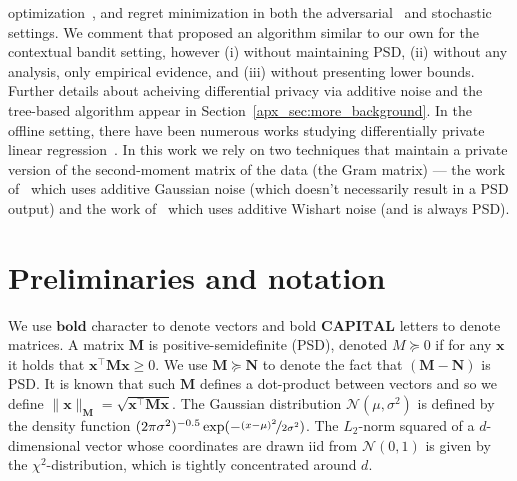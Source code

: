 \documentclass{article}
\renewcommand{\vec}[1]{\bm{#1}}
\providecommand\transp{\top}
\let\transpsymbol\transp
\renewcommand{\transp}[1]{#1^\transpsymbol}
\newcommand{\Normal}{\mathcal{N}}
\begin{document}
optimization~\cite{JainDPOnlineLearning2012}, and regret minimization
in both the
adversarial~\citep{SmithThakurtaPrivateOnlineLearning2013,TossouAchievingPrivacyAdversarial2017}
and
stochastic~\cite{MishraNearlyOptimalDPBandits2015,TossouAlgDPBandits2016}
settings. We comment that \citet{MishraNearlyOptimalDPBandits2015}
proposed an algorithm similar to our own for the contextual bandit
setting, however (i) without maintaining PSD, (ii) without any
analysis, only empirical evidence, and (iii) without presenting lower
bounds. Further details about acheiving differential privacy via additive noise and the tree-based algorithm appear in Section~\ref{apx_sec:more_background}.
%
In the offline setting, there have been numerous works studying differentially private linear regression~\citep{ChaudhuriDPERM2011,BassilyPrivateEmpiricalRisk2014}. In this work we rely on two techniques that maintain a private version of the second-moment matrix of the data (the Gram matrix) --- the work of~\cite{DworkAnalyzeGauss2014} which uses additive Gaussian noise (which doesn't necessarily result in a PSD output) and the work of~\cite{SheffetPrivateApproxRegression2015} which uses additive Wishart noise (and is always PSD).

\section{Preliminaries and notation}
\label{sec:preliminaries}

We use $\vec{bold}$ character to denote vectors and bold $\vec{CAPITAL}$ letters to denote matrices. A matrix $\vec M$ is positive-semidefinite (PSD), denoted $M\succeq 0$ if for any $\vec x$ it holds that $\transp{\vec  x} \vec M \vec x \geq 0$. We use $\vec M\succeq \vec N$ to denote the fact that $(\vec M-\vec N)$ is PSD. It is known that such $\vec M$ defines a dot-product between vectors and so we define $\|\vec x\|_{\vec M} = \sqrt{\transp{\vec  x} \vec M \vec x}$. The Gaussian distribution $\Normal(\mu,\sigma^2)$ is defined by the density function $(2\pi\sigma^2)^{-0.5}\exp(-\nicefrac{(x-\mu)^2}{2\sigma^2})$. The $L_2$-norm squared of a $d$-dimensional vector whose coordinates are drawn iid from $\Normal(0,1)$ is given by the $\chi^2$-distribution, which is tightly concentrated around $d$. %
\end{document}
